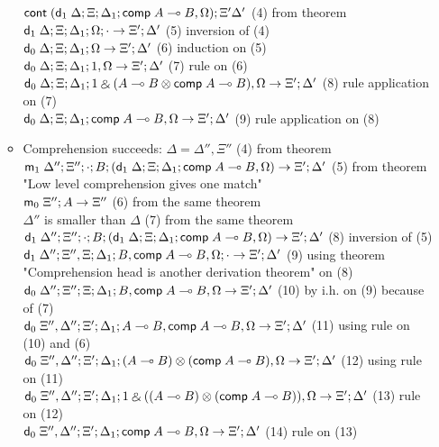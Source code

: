 \documentclass[9pt]{article}
\begin{document}
\begin{itemize}
\begin{itemize}
$\mathsf{cont} \; (\mathsf{d}_1 \; \Delta; \Xi; \Delta_1; \mathsf{comp} \; A \multimap B, \Omega); \Xi' \Delta'$ \hfill (4) from theorem \\
$\mathsf{d}_1 \; \Delta; \Xi; \Delta_1; \Omega; \cdot \rightarrow \Xi'; \Delta'$ \hfill (5) inversion of (4) \\
$\mathsf{d}_0 \; \Delta; \Xi; \Delta_1; \Omega \rightarrow \Xi'; \Delta'$ \hfill (6) induction on (5) \\
$\mathsf{d}_0 \; \Delta; \Xi; \Delta_1; 1, \Omega \rightarrow \Xi';\Delta'$ \hfill (7) rule on (6) \\
$\mathsf{d}_0 \; \Delta; \Xi; \Delta_1; 1 \mathbin{\binampersand} (A \multimap B \otimes \mathsf{comp} \; A \multimap B), \Omega \rightarrow \Xi'; \Delta'$ \hfill (8) rule application on (7) \\
$\mathsf{d}_0 \; \Delta; \Xi; \Delta_1; \mathsf{comp} \; A \multimap B, \Omega \rightarrow \Xi'; \Delta'$ (9) rule application on (8) \\
\item Comprehension succeeds:
$\Delta = \Delta'', \Xi''$ \hfill (4) from theorem \\
$\mathsf{m}_1 \; \Delta''; \Xi''; \cdot ; B; (\mathsf{d}_1 \; \Delta; \Xi; \Delta_1; \mathsf{comp} \; A \multimap B, \Omega) \rightarrow \Xi'; \Delta'$ \hfill (5) from theorem "Low level comprehension gives one match" \\
$\mathsf{m}_0 \; \Xi''; A \rightarrow \Xi''$ \hfill (6) from the same theorem \\
$\Delta''$ is smaller than $\Delta$ \hfill (7) from the same theorem \\
$\mathsf{d}_1 \; \Delta''; \Xi''; \cdot; B; (\mathsf{d}_1 \; \Delta; \Xi; \Delta_1; \mathsf{comp} \; A \multimap B, \Omega) \rightarrow \Xi'; \Delta'$ \hfill (8) inversion of (5) \\
$\mathsf{d}_1 \; \Delta''; \Xi'', \Xi; \Delta_1; B, \mathsf{comp} \; A \multimap B, \Omega; \cdot \rightarrow \Xi'; \Delta'$ \hfill (9) using theorem "Comprehension head is another derivation theorem" on (8) \\
$\mathsf{d}_0 \; \Delta''; \Xi''; \Xi; \Delta_1; B, \mathsf{comp} \; A \multimap B, \Omega \rightarrow \Xi'; \Delta'$ \hfill (10) by i.h. on (9) because of (7) \\
$\mathsf{d}_0 \; \Xi'', \Delta''; \Xi'; \Delta_1; A \multimap B, \mathsf{comp} \; A \multimap B, \Omega \rightarrow \Xi'; \Delta'$ \hfill (11) using rule on (10) and (6) \\
$\mathsf{d}_0 \; \Xi'', \Delta''; \Xi'; \Delta_1; (A \multimap B) \otimes (\mathsf{comp} \; A \multimap B), \Omega \rightarrow \Xi'; \Delta'$ \hfill (12) using rule on (11) \\
$\mathsf{d}_0 \; \Xi'', \Delta''; \Xi'; \Delta_1; 1 \mathbin{\binampersand} ((A \multimap B) \otimes (\mathsf{comp} \; A \multimap B)), \Omega \rightarrow \Xi'; \Delta'$ \hfill (13) rule on (12) \\
$\mathsf{d}_0 \; \Xi'', \Delta''; \Xi'; \Delta_1; \mathsf{comp} \; A \multimap B, \Omega \rightarrow \Xi'; \Delta'$ \hfill (14) rule on (13) \\

\end{itemize}
\end{itemize}
\end{document}

